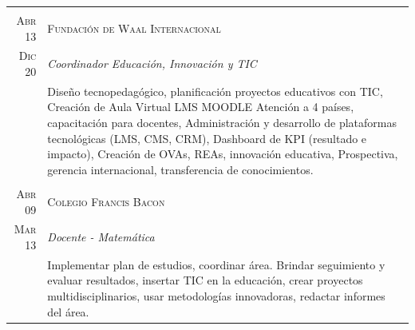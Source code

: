 \documentclass[a4paper]{article}
\begin{document}
\begin{longtable}{r|p{12cm}}
\multicolumn{2}{c}{} \\
\textsc{Abr 13} &  \textsc{Fundación de Waal Internacional} \\ \textsc{Dic 20}&\emph{Coordinador Educación, Innovación y TIC}\\&\footnotesize{Diseño tecnopedagógico, planificación proyectos educativos con TIC, Creación de Aula Virtual LMS MOODLE Atención a 4 países, capacitación para docentes, Administración y desarrollo de plataformas tecnológicas (LMS, CMS, CRM), Dashboard de KPI (resultado e impacto), Creación de OVAs, REAs, innovación educativa, Prospectiva, gerencia internacional, transferencia de conocimientos.}\\ 

\multicolumn{2}{c}{} \\
\textsc{Abr 09} & \textsc{Colegio Francis Bacon}\\\textsc{ Mar 13}& \emph{Docente - Matemática}\\&\footnotesize{Implementar plan de estudios, coordinar área. Brindar seguimiento y evaluar resultados, insertar TIC en la educación, crear proyectos multidisciplinarios, usar metodologías innovadoras, redactar informes del área.}\\
\end{longtable}
\end{document}
